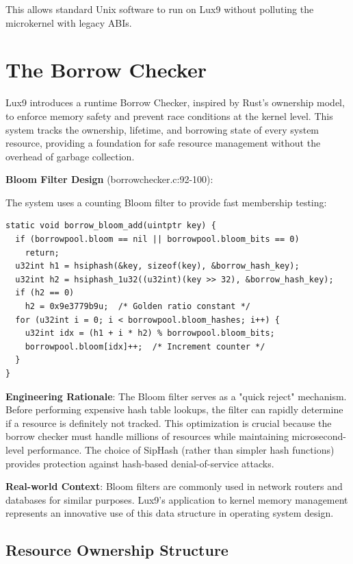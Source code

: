 \documentclass[11pt,letterpaper]{article}
\begin{document}
This allows standard Unix software to run on Lux9 without polluting the microkernel with legacy ABIs.

\section{The Borrow Checker}

Lux9 introduces a runtime Borrow Checker, inspired by Rust's ownership model, to enforce memory safety and prevent race conditions at the kernel level. This system tracks the ownership, lifetime, and borrowing state of every system resource, providing a foundation for safe resource management without the overhead of garbage collection.

\textbf{Bloom Filter Design} (borrowchecker.c:92-100):

The system uses a counting Bloom filter to provide fast membership testing:

\begin{lstlisting}
static void borrow_bloom_add(uintptr key) {
  if (borrowpool.bloom == nil || borrowpool.bloom_bits == 0)
    return;
  u32int h1 = hsiphash(&key, sizeof(key), &borrow_hash_key);
  u32int h2 = hsiphash_1u32((u32int)(key >> 32), &borrow_hash_key);
  if (h2 == 0)
    h2 = 0x9e3779b9u;  /* Golden ratio constant */
  for (u32int i = 0; i < borrowpool.bloom_hashes; i++) {
    u32int idx = (h1 + i * h2) % borrowpool.bloom_bits;
    borrowpool.bloom[idx]++;  /* Increment counter */
  }
}
\end{lstlisting}

\textbf{Engineering Rationale}: The Bloom filter serves as a "quick reject" mechanism. Before performing expensive hash table lookups, the filter can rapidly determine if a resource is definitely not tracked. This optimization is crucial because the borrow checker must handle millions of resources while maintaining microsecond-level performance. The choice of SipHash (rather than simpler hash functions) provides protection against hash-based denial-of-service attacks.

\textbf{Real-world Context}: Bloom filters are commonly used in network routers and databases for similar purposes. Lux9's application to kernel memory management represents an innovative use of this data structure in operating system design.

\subsection{Resource Ownership Structure}
\end{document}
